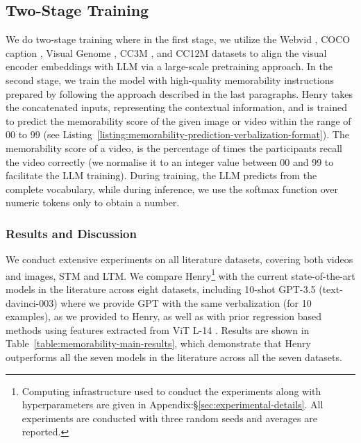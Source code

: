 \subsection{Two-Stage Training}
\label{sec:Two-Stage Training}
We do two-stage training where in the first stage, we utilize the Webvid \cite{bain2021frozen}, COCO caption \cite{chen2015microsoft}, Visual Genome \cite{krishna2017visual}, CC3M \cite{sharma2018conceptual}, and CC12M \cite{changpinyo2021conceptual} datasets to align the visual encoder embeddings with LLM via a large-scale pretraining approach. In the second stage, we train the model with high-quality memorability instructions prepared by following the approach described in the last paragraphs. Henry takes the concatenated inputs, representing the contextual information, and is trained to predict the memorability score of the given image or video within the range of 00 to 99 (see Listing~\ref{listing:memorability-prediction-verbalization-format}). The memorability score of a video, is the percentage of times the participants recall the video correctly (we normalise it to an integer value between 00 and 99 to facilitate the LLM training). During training, the LLM predicts from the complete vocabulary, while during inference, we use the softmax function over numeric tokens only to obtain a number.




\subsubsection{Results and Discussion}
\label{sec:results and discussion}
We conduct extensive experiments on all literature datasets, covering both videos and images, STM and LTM. We compare Henry\footnote{Computing infrastructure used to conduct the experiments along with hyperparameters are given in Appendix:\S\ref{sec:experimental-details}. All experiments are conducted with three random seeds and averages are reported.} with the current state-of-the-art models in the literature across eight datasets, including 10-shot GPT-3.5 (text-davinci-003) \cite{ouyang2022training} where we provide GPT with the same verbalization (for 10 examples), as we provided to Henry, as well as with prior regression based methods using features extracted from ViT L-14 \cite{hagen2023image}. Results are shown in Table~\ref{table:memorability-main-results}, which demonstrate that Henry outperforms all the seven models in the literature across all the seven datasets.



